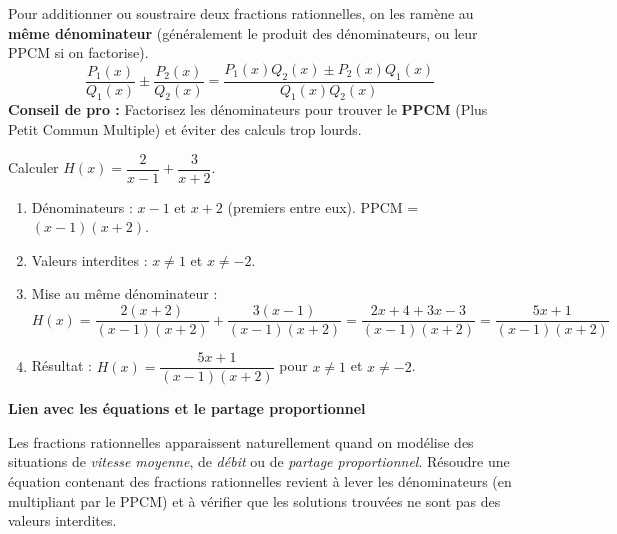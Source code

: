 \documentclass[11pt]{article}
\begin{document}
\begin{propriete}
Pour additionner ou soustraire deux fractions rationnelles, on les ramène au \textbf{même dénominateur} (généralement le produit des dénominateurs, ou leur PPCM si on factorise).
\[
\frac{P_1(x)}{Q_1(x)} \pm \frac{P_2(x)}{Q_2(x)} = \frac{P_1(x)Q_2(x) \pm P_2(x)Q_1(x)}{Q_1(x)Q_2(x)}
\]
\textbf{Conseil de pro :} Factorisez les dénominateurs pour trouver le \textbf{PPCM} (Plus Petit Commun Multiple) et éviter des calculs trop lourds.
\end{propriete}

\begin{exemplebox}
Calculer $H(x) = \dfrac{2}{x-1} + \dfrac{3}{x+2}$.
\begin{enumerate}
\item Dénominateurs : $x-1$ et $x+2$ (premiers entre eux). PPCM = $(x-1)(x+2)$.
\item Valeurs interdites : $x \neq 1$ et $x \neq -2$.
\item Mise au même dénominateur :
  \[
  H(x) = \frac{2(x+2)}{(x-1)(x+2)} + \frac{3(x-1)}{(x-1)(x+2)} = \frac{2x+4 + 3x-3}{(x-1)(x+2)} = \frac{5x+1}{(x-1)(x+2)}
  \]
\item Résultat : $H(x) = \dfrac{5x+1}{(x-1)(x+2)}$ pour $x \neq 1$ et $x \neq -2$.
\end{enumerate}
\end{exemplebox}

\textbf{Lien avec les équations et le partage proportionnel}\par

Les fractions rationnelles apparaissent naturellement quand on modélise des situations de \emph{vitesse moyenne}, de \emph{débit} ou de \emph{partage proportionnel}. Résoudre une équation contenant des fractions rationnelles revient à lever les dénominateurs (en multipliant par le PPCM) et à vérifier que les solutions trouvées ne sont pas des valeurs interdites.
\end{document}
